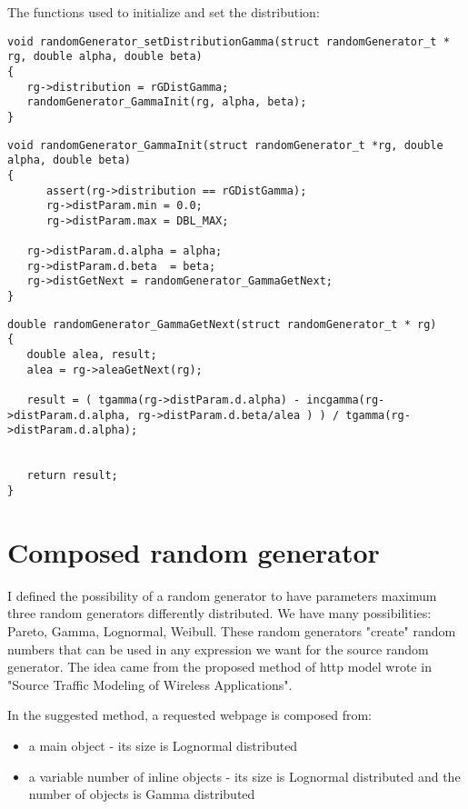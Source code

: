 The functions used to initialize and set the distribution:
\begin{verbatim}
void randomGenerator_setDistributionGamma(struct randomGenerator_t * rg, double alpha, double beta)
{
   rg->distribution = rGDistGamma;
   randomGenerator_GammaInit(rg, alpha, beta);
} 
\end{verbatim}


\begin{verbatim}
void randomGenerator_GammaInit(struct randomGenerator_t *rg, double alpha, double beta)
{
      assert(rg->distribution == rGDistGamma);   
      rg->distParam.min = 0.0;
      rg->distParam.max = DBL_MAX;
  
   rg->distParam.d.alpha = alpha;
   rg->distParam.d.beta  = beta; 
   rg->distGetNext = randomGenerator_GammaGetNext;
}
\end{verbatim}

\begin{verbatim}
double randomGenerator_GammaGetNext(struct randomGenerator_t * rg)
{
   double alea, result;
   alea = rg->aleaGetNext(rg);

   result = ( tgamma(rg->distParam.d.alpha) - incgamma(rg->distParam.d.alpha, rg->distParam.d.beta/alea ) ) / tgamma(rg->distParam.d.alpha); 
  
  
   return result;
}
\end{verbatim}

\section{Composed random generator}
\label{composed_rg}
   I defined the possibility of a random generator to have parameters maximum three random generators differently distributed. We have many possibilities: Pareto, Gamma, Lognormal, Weibull. These random generators "create" random numbers that can be used in any expression we want for the source random generator.
The idea came from the proposed method of http model wrote in "Source Traffic Modeling of Wireless Applications".

In the suggested method, a requested webpage is composed from:
\begin{itemize}
\item{a main object} - its size is Lognormal distributed
\item{a variable number of inline objects} - its size is Lognormal distributed and the number of objects is Gamma distributed
\end{itemize}


